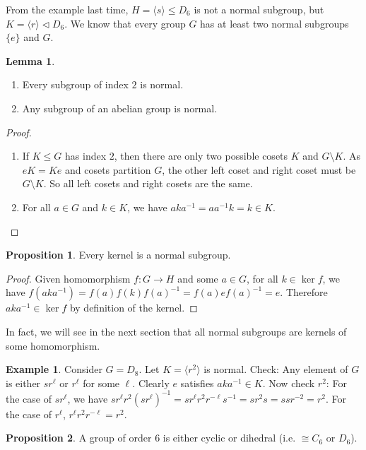 \documentclass[a4paper]{article}
\theoremstyle{definition}
\newtheorem*{prop}{Proposition}
\newtheorem*{eg}{Example}
\newtheorem*{lemma}{Lemma}
\newcommand{\bra}{\langle}
\newcommand{\ket}{\rangle}
\begin{document}
From the example last time, $H=\bra s\ket\leq D_6$ is not a normal subgroup, but $K=\bra r\ket \lhd D_6$. We know that every group $G$ has at least two normal subgroups $\{e\}$ and $G$.

\begin{lemma}\leavevmode
  \begin{enumerate}
  \item Every subgroup of index $2$ is normal.
  \item Any subgroup of an abelian group is normal.
  \end{enumerate}
\end{lemma}

\begin{proof}\leavevmode
  \begin{enumerate}
  \item If $K\leq G$ has index $2$, then there are only two possible cosets $K$ and $G\setminus K$. As $eK = Ke$ and cosets partition $G$, the other left coset and right coset must be $G\setminus K$. So all left cosets and right cosets are the same.
  \item For all $a\in G$ and $k\in K$, we have $aka^{-1} = aa^{-1}k = k\in K$.
  \end{enumerate}
\end{proof}
\begin{prop}
  Every kernel is a normal subgroup. 
\end{prop}

\begin{proof}
    Given homomorphism $f:G\rightarrow H$ and some $a\in G$, for all $k\in \ker f$, we have $f(aka^{-1}) = f(a)f(k)f(a)^{-1} = f(a)ef(a)^{-1} = e$. Therefore $aka^{-1}\in\ker f$ by definition of the kernel.
\end{proof}

In fact, we will see in the next section that all normal subgroups are kernels of some homomorphism.

\begin{eg}
  Consider $G = D_8$. Let $K = \bra r^2\ket$ is normal. Check: Any element of $G$ is either $sr^\ell$ or $r^\ell$ for some $\ell$. Clearly $e$ satisfies $aka^{-1}\in K$. Now check $r^2$: For the case of $sr^\ell$, we have $sr^\ell r^2(sr^\ell)^{-1} = sr^\ell r^2 r^{-\ell}s^{-1} = sr^2 s = ssr^{-2} = r^2$. For the case of $r^\ell$, $r^\ell r^2r^{-\ell} = r^2$.
\end{eg}

\begin{prop}
  A group of order $6$ is either cyclic or dihedral (i.e. $\cong C_6$ or $D_6$).
\end{prop}
\end{document}
